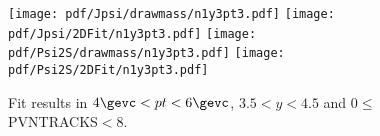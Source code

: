 \begin{figure}[H]
\begin{center}
\texttt{[image: pdf/Jpsi/drawmass/n1y3pt3.pdf]}
\texttt{[image: pdf/Jpsi/2DFit/n1y3pt3.pdf]}
\vspace*{-0.5cm}
\texttt{[image: pdf/Psi2S/drawmass/n1y3pt3.pdf]}
\texttt{[image: pdf/Psi2S/2DFit/n1y3pt3.pdf]}
\vspace*{-0.5cm}
\end{center}
\caption{Fit results in $4\gevc<pt<6\gevc$, $3.5<y<4.5$ and 0$\leq$PVNTRACKS$<$8.}
\label{Fitn1y3pt3}
\end{figure}

